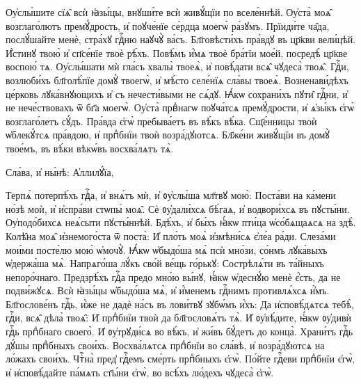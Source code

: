 \cuLettrine
Оу҆слы́шите сїѧ̑ всѝ ꙗ҆зы́цы, внꙋши́те всѝ живꙋ́щїи  по вселе́ннѣй. 
\hKv Оу҆ста̀ моѧ̑  возглаго́лютъ премꙋ́дрость, и҆ поꙋче́нїе  се́рдца моегѡ̀ ра́зꙋмъ. 
\hKv Прїиди́те ча̑да, послꙋ́шайте  менѐ, стра́хꙋ гдⷭ҇ню наꙋчꙋ̀ ва́съ. 
\hKv Бл҃говѣсти́хъ  пра́вдꙋ въ цр҃кви вели́цѣй. 
\hKv И҆́стинꙋ твою̀ и҆  сп҃се́нїе твоѐ рѣ́хъ. 
\hKv Повѣ́мъ и҆́мѧ твоѐ бра́тїи  мое́й, посредѣ̀ цр҃кве воспою́ тѧ. 
\hKv Оу҆слы́шати мѝ  гла́съ хвалы̀ твоеѧ̀, и҆ повѣ́дати всѧ̑ чꙋдеса̀ твоѧ̑. 
\hKv  Гдⷭ҇и, возлюби́хъ бл҃голѣ́пїе домꙋ̀ твоегѡ̀, и҆ мѣ́сто  селе́нїѧ сла́вы твоеѧ̀. 
\hKv Возненави́дѣхъ це́рковь  лꙋка́внꙋющихъ и҆ съ нечести́выми не сѧ́дꙋ. 
\hKv Ꙗ҆́кѡ  сохрани́хъ пꙋти̑ гдⷭ҇ни, и҆ не нече́ствовахъ ѿ бг҃а  моегѡ̀. 
\hKv Оу҆ста̀ првⷣнагѡ поꙋча́тсѧ премꙋ́дрости, и҆  ѧ҆зы́къ є҆гѡ̀ возглаго́летъ сꙋ́дъ. 
\hKv Пра́вда є҆гѡ̀  пребыва́етъ въ вѣ́къ вѣ́ка. 
\hKv Сщ҃е́нницы твоѝ  ѡ҆блекꙋ́тсѧ пра́вдою, и҆ прпⷣбнїи твоѝ возра́дꙋютсѧ. 
\hKv  Бл҃же́ни живꙋ́щїи въ домꙋ̀ твое́мъ, въ вѣ́ки вѣкѡ́въ  восхва́лѧтъ тѧ̀.  

\hKv Сла́ва, и҆ ны́нѣ: А҆ллилꙋ́їа,   





\cuLettrine
Терпѧ̀ потерпѣ́хъ гдⷭ҇а, и҆ внѧ́тъ мѝ, и҆ ᲂу҆слы́ша  мл҃твꙋ мою̀: 
\hKv Поста́ви на ка́мени но́зѣ моѝ, и҆  и҆спра́ви стѡпы̀ моѧ̑. 
\hKv Сѐ ᲂу҆дали́хсѧ бѣ́гаѧ, и҆  водвори́хсѧ въ пꙋсты́ни. 
\hKv Оу҆подо́бихсѧ неѧ́сыти  пꙋсты́ннѣй. 
\hKv Бдѣ́хъ, и҆ бы́хъ ꙗ҆́кѡ пти́ца  ѡ҆со́бѧщаѧсѧ на здѣ̀. 
\hKv Колѣ̑на моѧ̑ и҆знемого́ста ѿ  поста̀: 
\hKv И҆ пло́ть моѧ̀ и҆змѣни́сѧ є҆ле́а ра́ди. 
\hKv  Слеза́ми мои́ми посте́лю мою̀ ѡ҆мочꙋ̀. 
\hKv Ꙗ҆́кѡ ѡ҆быдо́ша  мѧ̀ псѝ мно́зи, со́нмъ лꙋка́выхъ ѡ҆держа́ша мѧ̀. 
\hKv  Напрѧго́ша лꙋ́къ сво́й ве́щь го́рькꙋ: 
\hKv Сострѣлѧ́ти въ  та́йныхъ непоро́чнаго. 
\hKv Предзрѣ́хъ гдⷭ҇а предо мно́ю  вы́нꙋ, ꙗ҆́кѡ ѡ҆деснꙋ́ю менѐ є҆́сть, да не подви́жꙋсѧ.  
\hKv Всѝ ꙗ҆зы́цы ѡ҆быдо́ша мѧ̀,  и҆ и҆́менемъ гдⷭ҇нимъ противлѧ́хсѧ и҆̀мъ. 
\hKv  Бл҃гослове́нъ гдⷭ҇ь, и҆́же не дадѐ на́съ въ лови́твꙋ  зꙋбѡ́мъ и҆́хъ: 
\hKv Да и҆сповѣ́дѧтсѧ тебѣ̀, гдⷭ҇и, всѧ̑  дѣла̀ твоѧ̑: 
\hKv И҆ прпⷣбнїи твоѝ да бл҃гословѧ́тъ тѧ̀.  
\hKv И҆ ᲂу҆вѣ́дите, ꙗ҆́кѡ ᲂу҆дивѝ гдⷭ҇ь прпⷣбнаго  своего̀. 
\hKv И҆ ᲂу҆трꙋди́сѧ во вѣ́къ, и҆ жи́въ бꙋ́детъ до  конца̀. 
\hKv Храни́тъ гдⷭ҇ь дꙋ́шы прпⷣбныхъ свои́хъ. 
\hKv  Восхва́лѧтсѧ прпⷣбнїи во сла́вѣ, и҆ возра́дꙋютсѧ на  ло́жахъ свои́хъ. 
\hKv Чтⷭ҇на̀ пред̾ гдⷭ҇емъ сме́рть  прпⷣбныхъ є҆гѡ̀. 
\hKv По́йте гдⷭ҇еви прпⷣбнїи є҆гѡ̀, и҆  и҆сповѣ́дайте па́мѧть ст҃ы́ни є҆гѡ̀, во всѣ́хъ лю́дехъ  чꙋдеса̀ є҆гѡ̀. 

